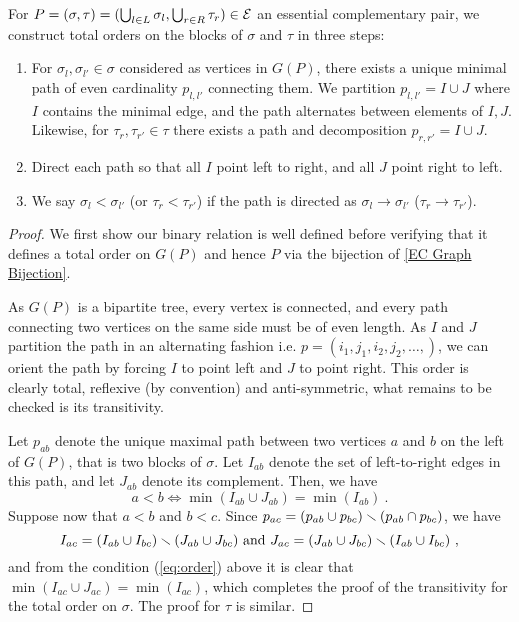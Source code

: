 \begin{construction} 
\label{const:total order on blocks of EC}
For $P=(\sigma,\tau) = (\bigcup_{l\in L}\sigma_l,\bigcup_{r\in R} \tau_r) \in \mathcal{E}$ an essential complementary pair, we construct total orders on the blocks of $\sigma$ and $\tau$ in three steps:
\begin{enumerate}
    \item For $\sigma_l,\sigma_{l'} \in \sigma$ considered as vertices in $G(P)$, there exists a unique minimal path of even cardinality $p_{l,l'}$ connecting them.
    We partition $p_{l,l'}=I\cup J$ where $I$ contains the minimal edge, and the path alternates between elements of $I,J$. Likewise, for $\tau_r,\tau_{r'}\in \tau$ there exists a path and decomposition $p_{r,r'} = I\cup J$.
    \item Direct each path so that all $I$ point left to right, and all $J$ point right to left.
    \item We say $\sigma_l< \sigma_{l'}$ (or $\tau_r < \tau_{r'}$) if the path is directed as $\sigma_l \to \sigma_{l'}$ ($\tau_r \to \tau_{r'}$).
\end{enumerate}
\end{construction}

\begin{proof}
We first show our binary relation is well defined before verifying that it defines a total order on $G(P)$ and hence $P$ via the bijection of \cref{EC Graph Bijection}.

As $G(P)$ is a bipartite tree, every vertex is connected, and every path connecting two vertices on the same side must be of even length. 
As $I$ and $J$ partition the path in an alternating fashion i.e. $p=(i_1,j_1,i_2,j_2,\dots, )$, we can orient the path by forcing $I$ to point left and $J$ to point right. 
This order is clearly total, reflexive (by convention) and anti-symmetric, what remains to be checked is its transitivity. 

Let $p_{ab}$ denote the unique maximal path between two vertices $a$ and $b$ on the left of $G(P)$, that is two blocks of $\sigma$. 
Let $I_{ab}$ denote the set of left-to-right edges in this path, and let $J_{ab}$ denote its complement. 
Then, we have 
\begin{equation}
    \label{eq:order}
    a < b \iff \min(I_{ab}\cup J_{ab})=\min(I_{ab}) \ . 
\end{equation}
Suppose now that $a < b$ and $b < c$.
Since $p_{ac}= (p_{ab} \cup p_{bc}) \smallsetminus (p_{ab} \cap p_{bc})$, we have $$ I_{ac}=(I_{ab}\cup I_{bc}) \smallsetminus (J_{ab} \cup J_{bc}) \text{ and } J_{ac}=(J_{ab}\cup J_{bc}) \smallsetminus (I_{ab} \cup I_{bc}) \ , $$ and from the condition (\ref{eq:order}) above it is clear that $\min(I_{ac}\cup J_{ac})=\min(I_{ac})$, which completes the proof of the transitivity for the total order on $\sigma$. 
The proof for $\tau$ is similar. 
\end{proof}

